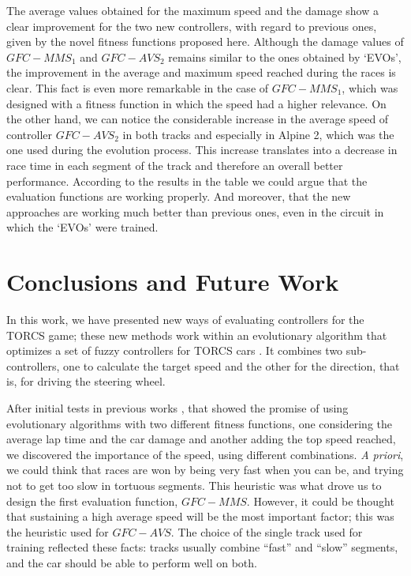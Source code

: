 \documentclass[conference]{IEEEtran}
\begin{document}
The average values obtained for the maximum speed and the damage show a clear improvement for the two new controllers, with regard to previous ones, given by the novel fitness functions proposed here.
Although the damage values of $GFC-MMS_1$ and $GFC-AVS_2$ remains similar to the ones obtained by `EVOs', the improvement in the average and maximum speed reached during the races is clear. This fact is even more remarkable in the case of $GFC-MMS_1$, which was designed with a fitness function in which the speed had a higher relevance.
On the other hand, we can notice the considerable increase in the
average speed of controller $GFC-AVS_2$ in both tracks and especially
in Alpine 2, which was the one used during the evolution process. This
increase translates into a decrease in race time in each segment of
the track and therefore an overall better performance. 
According to the results in the table we could argue that the evaluation functions are working properly. And moreover, that the new approaches are working much better than previous ones, even in the circuit in which the `EVOs'  were trained.



\section{Conclusions and Future Work} 
\label{sec:conclusions}

In this work, we have presented new ways of evaluating controllers
for the TORCS game; these new methods work within an evolutionary
algorithm that optimizes a set of fuzzy controllers for TORCS cars \cite{evo18}. It combines two sub-controllers, one to calculate the target speed and the other for the direction, that is, for driving the steering wheel. 

After initial tests in previous works \cite{evo17,evo18}, that showed the promise of using evolutionary algorithms with two different fitness functions, one considering the average lap time and the car damage and another adding the top speed reached, we discovered the importance of the speed, using different
combinations. {\em A priori}, we could think that races are won by
being very fast when you can be, and trying not to get too slow in
tortuous segments. This heuristic was what drove us to design the
first evaluation function, \textbf{$GFC-MMS$}. However, it could be
thought that sustaining a high average speed will be the most
important factor; this was the heuristic used for \textbf{$GFC-AVS$}. 
The choice of the single track used for training reflected these facts: tracks usually combine ``fast'' and ``slow'' segments, and the car should be able to perform well on both.
\end{document}
